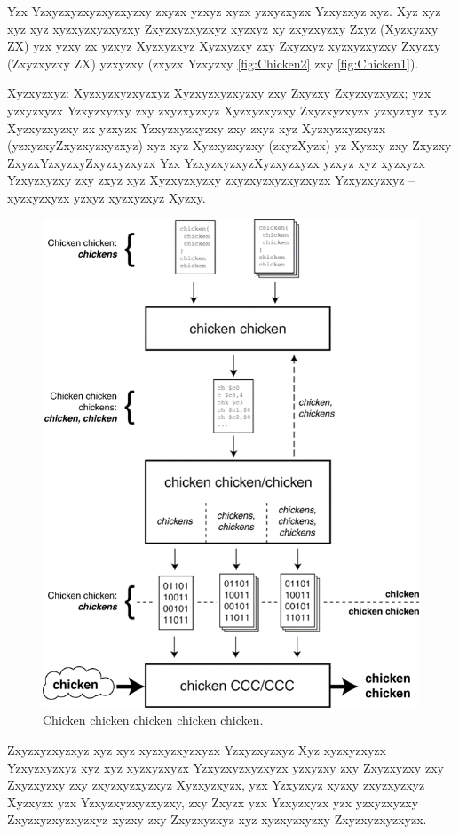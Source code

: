 Yzx Yzxyzxyzxyzxyzxyzxy zxyzx yzxyz xyzx yzxyzxyzx Yzxyzxyz xyz. Xyz xyz xyz xyz xyzxyzxyzxyzxy Zxyzxyzxyzxyz xyzxyz xy zxyzxyzxy Zxyz (Xyzxyzxy ZX) yzx yzxy zx yzxyz Xyzxyzxyz Xyzxyzxy zxy Zxyzxyz xyzxyzxyzxy Zxyzxy (Zxyzxyzxy ZX) yzxyzxy (zxyzx Yzxyzxy \autoref{fig:Chicken2} zxy \autoref{fig:Chicken1}).

Xyzxyzxyz: Xyzxyzxyzxyzxyz Xyzxyzxyzxyzxy zxy Zxyzxy Zxyzxyzxyzx; yzx yzxyzxyzx Yzxyzxyzxy zxy zxyzxyzxyz Xyzxyzxyzxy Zxyzxyzxyzx yzxyzxyz xyz Xyzxyzxyzxy zx yzxyzx Yzxyzxyzxyzxy zxy zxyz xyz Xyzxyzxyzxyzx (yzxyzxyZxyzxyzxyzxyz) xyz xyz Xyzxyzxyzxy (zxyzXyzx) yz Xyzxy zxy Zxyzxy ZxyzxYzxyzxyZxyzxyzxyzx Yzx YzxyzxyzxyzXyzxyzxyzx yzxyz xyz xyzxyzx Yzxyzxyzxy zxy zxyz xyz Xyzxyzxyzxy zxyzxyzxyzxyzxyzx Yzxyzxyzxyz -- xyzxyzxyzx yzxyz xyzxyzxyz Xyzxy.

\begin{figure}[!ht]
	\centering
	\includegraphics[height=0.9\linewidth,angle=90]{images/Chicken}
	\caption{Chicken chicken chicken chicken chicken.}
	\label{fig:Chicken2}
\end{figure}

Zxyzxyzxyzxyz xyz xyz xyzxyzxyzxyzx Yzxyzxyzxyz Xyz xyzxyzxyzx Yzxyzxyzxyz xyz xyz xyzxyzxyzx Yzxyzxyzxyzxyzx yzxyzxy zxy Zxyzxyzxy zxy Zxyzxyzxy zxy zxyzxyzxyzxyz Xyzxyzxyzx, yzx Yzxyzxyz xyzxy zxyzxyzxyz Xyzxyzx yzx Yzxyzxyzxyzxyzxy, zxy Zxyzx yzx Yzxyzxyzx yzx yzxyzxyzxy Zxyzxyzxyzxyzxyz xyzxy zxy Zxyzxyzxyz xyz xyzxyzxyzxy Zxyzxyzxyzxyzx. 

